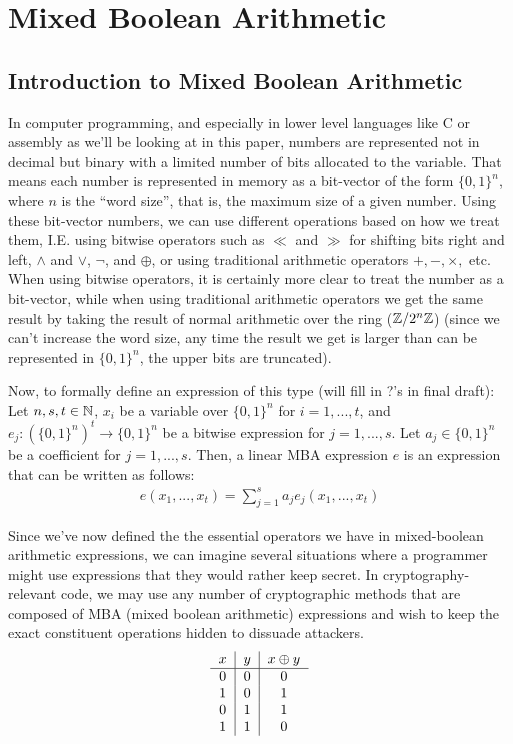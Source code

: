 \section{Mixed Boolean Arithmetic}
\subsection{Introduction to Mixed Boolean Arithmetic}
In computer programming, and especially in lower level languages like C or 
assembly as we'll be looking at in this paper, numbers are represented
not in decimal but binary with a limited number of bits allocated to the 
variable. That means each number is represented in memory as a bit-vector of
the form $\{0,1\}^n$, where $n$ is the ``word size'', that is, the maximum 
size of a given number. Using these bit-vector numbers, we can use different
operations based on how we treat them, I.E. using bitwise operators such as
$\ll$ and $\gg$ for shifting bits right and left, $\land$ and $\lor$, $\neg$, 
and $\oplus$, or using traditional arithmetic operators $+, -, \times,$ etc.
When using bitwise operators, it is certainly more clear to treat the 
number as a bit-vector, while when using traditional arithmetic operators
we get the same result by taking the result of normal arithmetic over the ring 
($\mathbb{Z}/2^n\mathbb{Z}$) (since we can't increase the word size, any time the result we
get is larger than can be represented in $\{0,1\}^n$, the upper bits are truncated).
\par Now, to formally define an expression of this type (will fill in ?'s in final draft):
 {Let $n,s,t \in \mathbb{N}$, $x_i$ be a variable over $\{0,1\}^n$ for
$i = 1,...,t$, and $e_j : (\{0,1\}^n)^t \rightarrow \{0,1\}^n$ be a bitwise expression for
$j = 1,...,s$. Let $a_j\in \{0,1\}^n$ be a coefficient for $j = 1,...,s$.
Then, a linear MBA expression $e$ is an expression that can be written as follows:
\begin{align*}
    e(x_1, ..., x_t) = \sum_{j=1}^s a_j e_j(x_1,...,x_t)
\end{align*}
}
\par Since we've now defined the the essential operators we have in mixed-boolean 
arithmetic
expressions, we can imagine several situations where a programmer might use expressions 
that they would rather keep secret. In cryptography-relevant code, we may use any
number of cryptographic methods that are composed of MBA (mixed boolean arithmetic)
expressions
and wish to keep the exact constituent operations hidden 
to dissuade attackers. 
\\
\begin{align*}
    \begin{tabular}{c|c|c}
        $x$ & $y$ & $x \oplus y$ \\
        \hline
        0 & 0 & 0 \\
        1 & 0 & 1 \\
        0 & 1 & 1 \\
        1 & 1 & 0 \\
    \end{tabular}
\end{align*}
